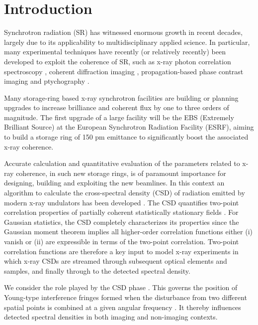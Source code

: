 \documentclass[%
 reprint,
 amsmath,amssymb,
 aps,
]{revtex4-1}
\begin{document}
\section{Introduction}

Synchrotron radiation (SR) has witnessed enormous growth in recent decades, largely due to its applicability to multidisciplinary applied science. In particular, many experimental techniques have recently (or relatively recently) been developed to exploit the coherence of SR, such as x-ray photon correlation spectroscopy \cite{XPCS}, coherent diffraction imaging \cite{CDI}, propagation-based phase contrast imaging \cite{PBPCI} and ptychography \cite{Ptychography}. 

Many storage-ring based x-ray synchrotron facilities are building or planning upgrades to increase brilliance and coherent flux by one to three orders of magnitude.  The first upgrade of a large facility will be the EBS (Extremely Brilliant Source) \cite{orangebook} at the European Synchrotron Radiation Facility (ESRF), aiming to build a storage ring of 150 pm emittance to significantly boost the associated x-ray coherence.

Accurate calculation and quantitative evaluation of the parameters related to x-ray coherence, in such new storage rings, is of paramount importance for designing, building and exploiting the new beamlines. In this context an algorithm to calculate the cross-spectral density (CSD) of radiation emitted by modern x-ray undulators has been developed \cite{glass}.  The CSD quantifies two-point correlation properties of partially coherent statistically stationary fields \cite{Wolf1982,mandel_wolf}.  For Gaussian statistics, the CSD completely characterizes its properties since the Gaussian moment theorem implies all higher-order correlation functions either (i) vanish or (ii) are expressible in terms of the two-point correlation.  Two-point correlation functions are therefore a key input to model x-ray experiments in which x-ray CSDs are streamed through subsequent optical elements and samples, and finally through to the detected spectral density.  

We consider the role played by the CSD phase \cite{Schouten2003,GburVisser2003,Bogatyryova2003}. This governs the position of Young-type interference fringes formed when the disturbance from two different spatial points is combined at a given angular frequency \cite{mandel_wolf}.  It thereby influences detected spectral densities in both imaging and non-imaging contexts.  
\end{document}
